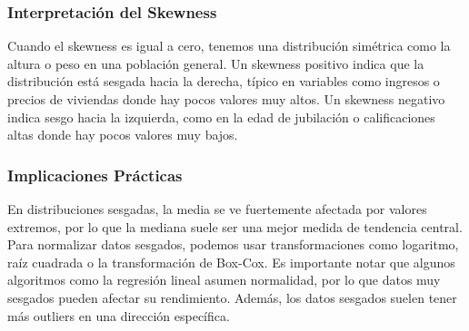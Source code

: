 \documentclass[12pt]{article}
\begin{document}
\begin{center}
\end{center}

\subsubsection{Interpretación del Skewness}
Cuando el skewness es igual a cero, tenemos una distribución simétrica como la altura o peso en una población general. Un skewness positivo indica que la distribución está sesgada hacia la derecha, típico en variables como ingresos o precios de viviendas donde hay pocos valores muy altos. Un skewness negativo indica sesgo hacia la izquierda, como en la edad de jubilación o calificaciones altas donde hay pocos valores muy bajos.

\subsubsection{Implicaciones Prácticas}
En distribuciones sesgadas, la media se ve fuertemente afectada por valores extremos, por lo que la mediana suele ser una mejor medida de tendencia central. Para normalizar datos sesgados, podemos usar transformaciones como logaritmo, raíz cuadrada o la transformación de Box-Cox. Es importante notar que algunos algoritmos como la regresión lineal asumen normalidad, por lo que datos muy sesgados pueden afectar su rendimiento. Además, los datos sesgados suelen tener más outliers en una dirección específica.
\end{document}

